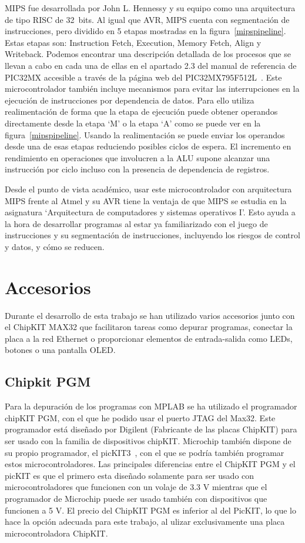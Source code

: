 
MIPS fue desarrollada por John L. Hennessy y su equipo como una arquitectura de tipo RISC de 32~bits. Al igual que AVR, MIPS cuenta con segmentación de instrucciones, pero dividido en 5 etapas mostradas en la figura~\ref{mipspipeline}. Estas etapas son: Instruction Fetch, Execution, Memory Fetch, Align y Writeback. Podemos encontrar una descripción detallada de los procesos que se llevan a cabo en cada una de ellas en el apartado 2.3 del manual de referencia de PIC32MX accesible a través de la página web del PIC32MX795F512L~\cite{website:pic32mx}. Este microcontrolador también incluye mecanismos para evitar las interrupciones en la ejecución de instrucciones por dependencia de datos. Para ello utiliza realimentación de forma que la etapa de ejecución puede obtener operandos directamente desde la etapa `M' o la etapa `A' como se puede ver en la figura~\ref{mipspipeline}. Usando la realimentación se puede enviar los operandos desde una de esas etapas reduciendo posibles ciclos de espera. El incremento en rendimiento en operaciones que involucren a la ALU supone alcanzar una instrucción por ciclo incluso con la presencia de dependencia de registros.

Desde el punto de vista académico, usar este microcontrolador con arquitectura MIPS frente al Atmel y su AVR tiene la ventaja de que MIPS se estudia en la asignatura `Arquitectura de computadores y sistemas operativos I'. Esto ayuda a la hora de desarrollar programas al estar ya familiarizado con el juego de instrucciones y su segmentación de instrucciones, incluyendo los riesgos de control y datos, y cómo se reducen.

\section{Accesorios}
Durante el desarrollo de esta trabajo se han utilizado varios accesorios junto con el ChipKIT MAX32 que facilitaron tareas como depurar programas, conectar la placa a la red Ethernet o proporcionar elementos de entrada-salida como LEDs, botones o una pantalla OLED.\@
\subsection{Chipkit PGM}
Para la depuración de los programas con MPLAB se ha utilizado el programador chipKIT PGM\cite{website:pgm}, con el que he podido usar el puerto JTAG del Max32. Este programador está diseñado por Digilent (Fabricante de las placas ChipKIT) para ser usado con la familia de dispositivos chipKIT. Microchip también dispone de su propio programador, el picKIT3~\cite{website:pickit}, con el que se podría también programar estos microcontroladores. Las principales diferencias entre el ChipKIT PGM y el picKIT es que el primero esta diseñado solamente para ser usado con microcontroladores que funcionen con un volaje de 3.3 V mientras que el programador de Microchip puede ser usado también con dispositivos que funcionen a 5 V. El precio del ChipKIT PGM es inferior al del PicKIT, lo que lo hace la opción adecuada para este trabajo, al ulizar exclusivamente una placa microcontroladora ChipKIT.

